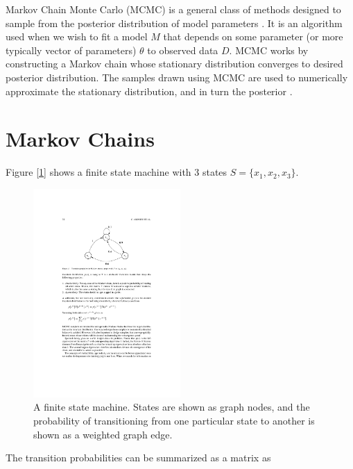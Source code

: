 


	Markov Chain Monte Carlo (MCMC) is a general class of methods designed to sample from the posterior distribution of model parameters \cite{Andrieu2003}. It is an algorithm used when we wish to fit a model $M$ that depends on some parameter (or more typically vector of parameters) $\theta$ to observed data $D$. MCMC works by constructing a Markov chain whose stationary distribution converges to desired posterior distribution. The samples drawn using MCMC are used to numerically approximate the stationary distribution, and in turn the posterior \cite{Andrieu2003}.


\section{Markov Chains}

    Figure [\ref{fsm}] shows a finite state machine with 3 states $S = \{x_1, x_2, x_3\}$.

    \begin{figure}
        \centering
        \captionsetup{width=0.8\linewidth}
        \includegraphics[width=0.5\textwidth]{./images/finitemachine.pdf}
        \caption{A finite state machine. States are shown as graph nodes, and the probability of transitioning from one particular state to another is shown as a weighted graph edge. \cite{Andrieu2003} \label{fsm}}
    \end{figure}

    The transition probabilities can be summarized as a matrix as

